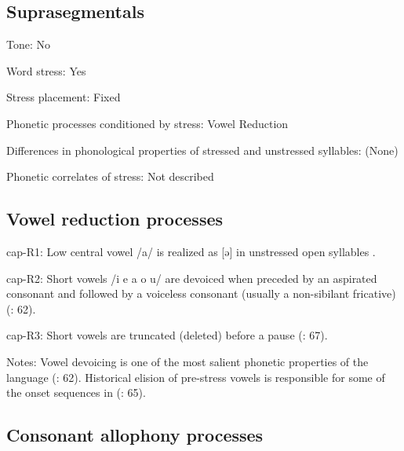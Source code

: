 {\subsection*{Suprasegmentals}
\begin{appendixdesc}
\item[Tone:] No

\item[Word stress:] Yes

\item[Stress placement:] Fixed

\item[Phonetic processes conditioned by stress:] Vowel Reduction

\item[Differences in phonological properties of stressed and unstressed syllables:] (None)

\item[Phonetic correlates of stress:] Not described
\end{appendixdesc}
\subsection*{Vowel reduction processes}
\begin{appendixdesc}

\item[cap-R1:] Low central vowel /a/ is realized as [ə] in unstressed open syllables \citep[301]{Olson1967}.

\item[cap-R2:] Short vowels /i e a o u/ are devoiced when preceded by an aspirated consonant and followed by a voiceless consonant (usually a non-sibilant fricative) (\citealt{Cerrón-Palomino2006}: 62).

\item[cap-R3:] Short vowels are truncated (deleted) before a pause (\citealt{Cerrón-Palomino2006}: 67).

\item[Notes:] Vowel devoicing is one of the most salient phonetic properties of the language (\citealt{Cerrón-Palomino2006}: 62). Historical elision of pre-stress vowels is responsible for some of the onset sequences in  (\citealt{Cerrón-Palomino2006}: 65).
\end{appendixdesc}
\subsection*{Consonant allophony processes}
\begin{appendixdesc}


\end{appendixdesc}}
